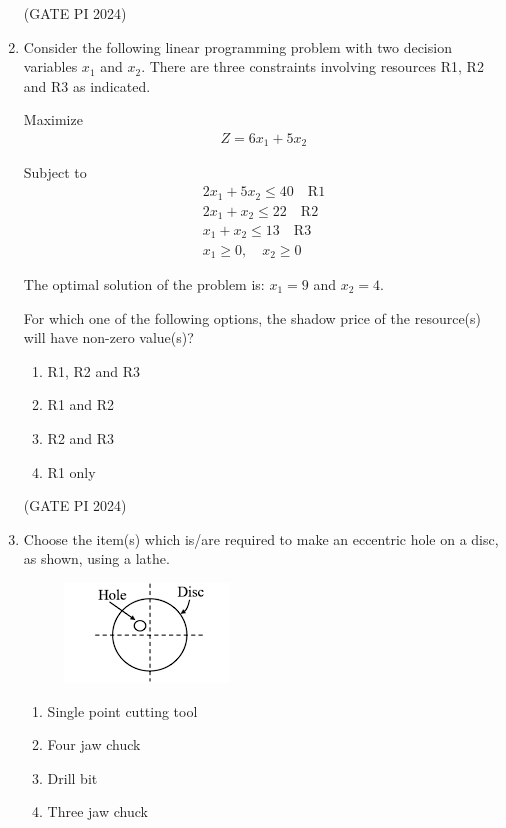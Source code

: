 \documentclass[journal,12pt,onecolumn]{IEEEtran}
\theoremstyle{remark}
\begin{document}
\begin{enumerate}
\hfill (GATE PI 2024)

\item  Consider the following linear programming problem with two decision variables $x_1$ and $x_2$. There are three constraints involving resources R1, R2 and R3 as indicated.

Maximize
\begin{align*}
    Z = 6x_1 + 5x_2
\end{align*}

Subject to
\begin{align*}
2x_1 + 5x_2 \leq 40 \quad \text{R1} \\
2x_1 + x_2 \leq 22 \quad \text{R2} \\
x_1 + x_2 \leq 13 \quad \text{R3} \\
x_1 \geq 0,\quad x_2 \geq 0 
\end{align*}

The optimal solution of the problem is: $x_1 = 9$ and $x_2 = 4$.

For which one of the following options, the shadow price of the resource(s) will have non-zero value(s)?

\begin{multicols}{2}
\begin{enumerate}
\item R1, R2 and R3
\item R1 and R2
\item R2 and R3
\item R1 only
\end{enumerate}
\end{multicols}

\hfill (GATE PI 2024)

\item Choose the item(s) which is/are required to make an eccentric hole on a disc, as shown, using a lathe.

\begin{figure}[H]
\centering
\includegraphics[width=0.5\columnwidth]{fig9.png}
\caption{}
\end{figure}

\begin{multicols}{2}
\begin{enumerate}
\item Single point cutting tool
\item Four jaw chuck
\item Drill bit
\item Three jaw chuck
\end{enumerate}
\end{multicols}


\end{enumerate}
\end{document}
